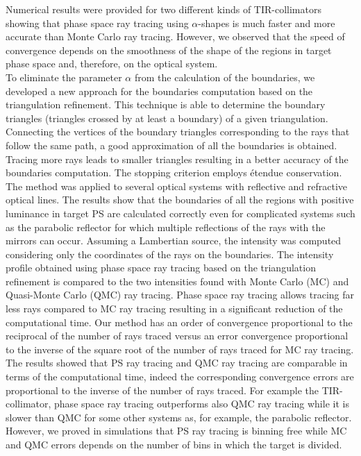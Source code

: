Numerical results were provided for two different kinds of TIR-collimators showing that phase space ray tracing using $\alpha$-shapes is much faster and more accurate than Monte Carlo ray tracing. However, we observed that the speed of convergence depends on the smoothness of the shape of the regions in target phase space and, therefore, on the optical system. \\ \indent To eliminate the parameter $\alpha$ from the calculation of the boundaries, we developed a new approach for the boundaries computation based on the triangulation refinement. 
This technique is able to determine the boundary triangles (triangles crossed by at least a boundary) of a given triangulation. Connecting the vertices of the boundary triangles corresponding to the rays that follow the same path, a good approximation of all the boundaries is obtained. Tracing more rays leads to smaller triangles resulting in a better accuracy of the boundaries computation. The stopping criterion employs \'{e}tendue conservation. 
The method was applied to several optical systems with reflective and refractive optical lines. The results show that the boundaries of all the regions with positive luminance in target PS are calculated correctly even for complicated systems such as the parabolic reflector for which multiple reflections of the rays with the mirrors can occur. Assuming a Lambertian source, the intensity was computed considering only the coordinates of the rays on the boundaries. 
The intensity profile obtained using phase space ray tracing based on the triangulation refinement is compared to the two intensities found with Monte Carlo (MC) and Quasi-Monte Carlo (QMC) ray tracing. Phase space ray tracing allows tracing far less rays compared to MC ray tracing resulting in a significant reduction of the computational time. Our method has an order of convergence proportional to the reciprocal of the number of rays traced versus an error convergence proportional to the inverse of the square root of the number of rays traced for MC ray tracing. The results showed that PS ray tracing and QMC ray tracing are comparable in terms of the computational time, indeed the corresponding convergence errors are proportional to the inverse of the number of rays traced. For example the TIR-collimator, phase space ray tracing outperforms also QMC ray tracing while it is slower than QMC for some other systems as, for example, the parabolic reflector. However, we proved in simulations that PS ray tracing is binning free while MC and QMC errors depends on the number of bins in which the target is divided.
